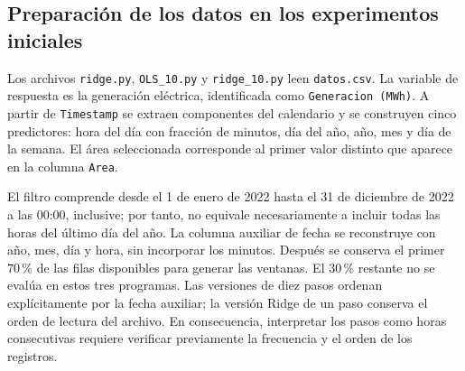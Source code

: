 \subsection{Preparación de los datos en los experimentos iniciales}

Los archivos \texttt{ridge.py}, \texttt{OLS\_10.py} y \texttt{ridge\_10.py} leen \texttt{datos.csv}. La variable de respuesta es la generación eléctrica, identificada como \texttt{Generacion (MWh)}. A partir de \texttt{Timestamp} se extraen componentes del calendario y se construyen cinco predictores: hora del día con fracción de minutos, día del año, año, mes y día de la semana. El área seleccionada corresponde al primer valor distinto que aparece en la columna \texttt{Area}.

El filtro comprende desde el 1 de enero de 2022 hasta el 31 de diciembre de 2022 a las 00:00, inclusive; por tanto, no equivale necesariamente a incluir todas las horas del último día del año. La columna auxiliar de fecha se reconstruye con año, mes, día y hora, sin incorporar los minutos. Después se conserva el primer 70\,\% de las filas disponibles para generar las ventanas. El 30\,\% restante no se evalúa en estos tres programas. Las versiones de diez pasos ordenan explícitamente por la fecha auxiliar; la versión Ridge de un paso conserva el orden de lectura del archivo. En consecuencia, interpretar los pasos como horas consecutivas requiere verificar previamente la frecuencia y el orden de los registros.
